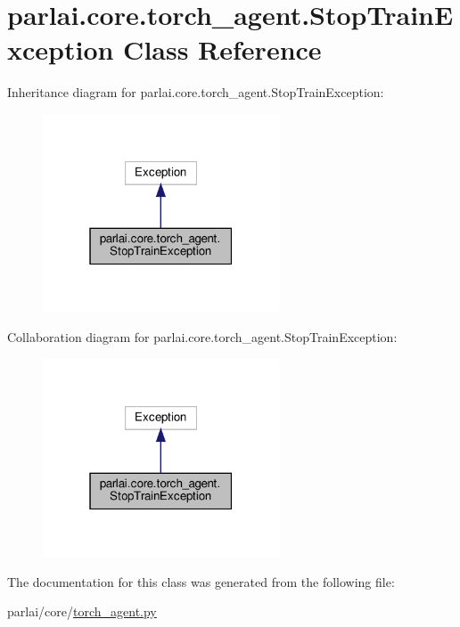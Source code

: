 \hypertarget{classparlai_1_1core_1_1torch__agent_1_1StopTrainException}{}\section{parlai.\+core.\+torch\+\_\+agent.\+Stop\+Train\+Exception Class Reference}
\label{classparlai_1_1core_1_1torch__agent_1_1StopTrainException}


Inheritance diagram for parlai.\+core.\+torch\+\_\+agent.\+Stop\+Train\+Exception\+:
\nopagebreak
\begin{figure}[H]
\begin{center}
\leavevmode
\includegraphics[width=199pt]{classparlai_1_1core_1_1torch__agent_1_1StopTrainException__inherit__graph}
\end{center}
\end{figure}


Collaboration diagram for parlai.\+core.\+torch\+\_\+agent.\+Stop\+Train\+Exception\+:
\nopagebreak
\begin{figure}[H]
\begin{center}
\leavevmode
\includegraphics[width=199pt]{classparlai_1_1core_1_1torch__agent_1_1StopTrainException__coll__graph}
\end{center}
\end{figure}


The documentation for this class was generated from the following file\+:\begin{DoxyCompactItemize}
\item 
parlai/core/\hyperlink{torch__agent_8py}{torch\+\_\+agent.\+py}\end{DoxyCompactItemize}
